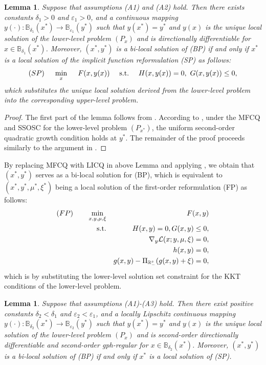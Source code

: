 \documentclass[11pt]{article}
\newtheorem{lemma}[theorem]{Lemma}
\theoremstyle{definition}
\theoremstyle{remark}
\numberwithin{equation}{section}
\begin{document}
\begin{lemma}\label{lem MFCQ SSOSC}
  Suppose that assumptions \textnormal{(A1)} and \textnormal{(A2)} hold. Then there exists constants
$\delta_1>0$ and $\varepsilon_1>0$, and a  continuous mapping $y(\cdot):\mathbb{B}_{\delta_1}(x^*)\to\mathbb{B}_{\varepsilon_1}(y^*)$ such that $y(x^*)=y^*$ and $y(x)$ is the unique local solution of the lower-level problem $(P_x)$ and is  directionally differentiable for $x\in \mathbb{B}_{\delta_1}(x^*)$. Moreover,  $(x^*,y^*)$ is a bi-local solution of (BP) if and only if  $x^*$ is a local solution of the implicit function reformulation  (SP) as follows:
\begin{equation*}
(SP)~~~~\min_x~~~~ F(x,y(x))~~~~{\rm s.t.}~~~~ H(x,y(x))= 0,~ G(x,y(x))\le 0,
\end{equation*}
which substitutes  the unique local solution derived from the lower-level problem into the corresponding
upper-level problem.
\end{lemma}
\begin{proof}
 The first part of the lemma follows from \cite[Theorem 1]{Ralph and Dempe 95}.
According to \cite[Proposition 5.37]{Bonnans}, under the MFCQ and SSOSC  for the lower-level problem $(P_{x^*})$, the uniform second-order quadratic growth condition holds at $y^*$.
The remainder of the proof proceeds similarly to the argument in \cite[Theorem 3.5]{Liu 25}.
\end{proof}

By replacing MFCQ with LICQ in above Lemma and applying \cite[Remark 3.6]{Liu 25}, we obtain that
$(x^*,y^*)$  serves as  a bi-local solution for (BP), which is equivalent to
  $(x^*,y^*,\mu^*,\xi^*)$ being a local solution of the first-order reformulation (FP) as follows:
 \begin{eqnarray*}
(FP)~~~~~~\min_{x,y,\mu,\xi} && F(x,y)\\
{\rm s.t.}&& H(x,y)= 0,G(x,y)\le 0,\\
&&\nabla_{y} \mathcal{L}(x;y,\mu,\xi)=0,\\
&&h(x,y)=0,\\
&&g(x,y )-\Pi_{\mathbb{R}^s_{-}}(g(x,y)+\xi)=0,
\end{eqnarray*}
which is by substituting the lower-level solution set constraint for the KKT conditions
of the lower-level problem.

\begin{lemma}\label{lem MFCQ SSOSC CRCQ}
  Suppose that assumptions \textnormal{(A1)}-\textnormal{(A3)} hold. Then there exist positive constants
$\delta_2<\delta_1$ and $\varepsilon_2<\varepsilon_1$, and a locally Lipschitz continuous mapping $y(\cdot):\mathbb{B}_{\delta_2}(x^*) \to \mathbb{B}_{\varepsilon_2}(y^*)$ such that $y(x^*)=y^*$ and $y(x)$ is
the unique local solution of the lower-level problem $(P_x)$ and   is second-order directionally differentiable and  second-order gph-regular for $x \in \mathbb{B}_{\delta_2}(x^*)$.
  Moreover,  $(x^*,y^*)$ is a bi-local solution of (BP) if and only if  $x^*$ is a local solution of (SP).
\end{lemma}
\end{document}

